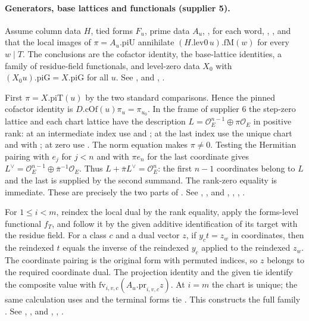 \paragraph{Generators, base lattices and functionals (supplier 5).}
Assume column data $H$, tied forms $F_u$, prime data $A_u$,
,  for each word, , ,
and that the local images of $\pi=A_u.\mathrm{piU}$ annihilate
$(H.\mathrm{lev0}\,u).\mathrm{fM}(w)$ for every $w\mid T$.
The conclusions are the cofactor identity, the base-lattice identities,
a family of residue-field functionals, and level-zero data $X_0$
with $(X_0u).\mathrm{piG}=X.\mathrm{piG}$ for all $u$.
See ,
and ,
.

First $\pi=X.\mathrm{piT}(u)$ by the two standard comparisons.
Hence the pinned cofactor identity is
$D.\mathrm{cOf}(u)\pi_u=\pi_{u_0}$. In the frame of supplier 6 the
step-zero lattice and each chart lattice have the description
$L=\mathcal O_E^{n-1}\oplus\pi\mathcal O_E$ in positive rank:
at an intermediate index use  and ;
at the last index use the unique chart and  with
; at zero use . The norm equation
makes $\pi\ne0$. Testing the Hermitian pairing with $e_j$ for
$j<n$ and with $\pi e_n$ for the last coordinate gives
$L^\vee=\mathcal O_E^{n-1}\oplus\bar\pi^{-1}\mathcal O_E$.
Thus $L+\bar\pi L^\vee=\mathcal O_E^n$: the first $n-1$
coordinates belong to $L$ and the last is supplied by the second
summand. The rank-zero equality is immediate. These are precisely
the two parts of .
See , ,
and , ,
,
.

For $1\le i<m$, reindex the local dual by the rank equality, apply the
forms-level functional $f_T$, and follow it by the given additive
identification of its target with the residue field. For a class
$c$ and a dual vector $z$, if $y_c t=z_w$ in coordinates, then the
reindexed $t$ equals the inverse of the reindexed $y_c$ applied to the
reindexed $z_w$. The coordinate pairing is the original form with
permuted indices, so $z$ belongs to the required coordinate dual.
The projection identity  and the given tie
 identify the composite value with
$\mathrm{fv}_{i,v,c}(A_u.\mathrm{pr}_{i,v,c}z)$. At $i=m$ the chart
is unique; the same calculation uses  and the terminal
forms tie . This constructs the full family
.
See ,
,
and ,
,
.

